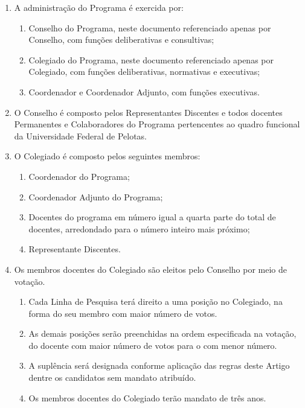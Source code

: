 \documentclass{article}
\newcommand{\grupoMenor}{Colegiado\xspace}
\newcommand{\grupoMaior}{Conselho\xspace}
\begin{document}
\begin{enumerate}

	\item A administração do Programa é exercida por:
	\begin{enumerate}[label=\Roman*]	
		\item \grupoMaior do Programa, neste documento referenciado apenas por \grupoMaior, com funções deliberativas e consultivas;
		\item \grupoMenor do Programa, neste documento referenciado apenas por \grupoMenor, com funções deliberativas, normativas e executivas;
		\item Coordenador e Coordenador Adjunto, com funções executivas.
	\end{enumerate}

	\item O \grupoMaior é composto pelos Representantes Discentes e todos docentes Permanentes e Colaboradores do Programa pertencentes ao quadro funcional da Universidade Federal de Pelotas.

	\item O \grupoMenor é composto pelos seguintes membros:
	\begin{enumerate}[label=\Roman*]
		\item Coordenador do Programa;
		\item Coordenador Adjunto do Programa;
		\item Docentes do programa em número igual a quarta parte do total de docentes, arredondado para o número inteiro mais próximo;
		\item Representante Discentes.
	\end{enumerate}

	\item Os membros docentes do \grupoMenor são eleitos pelo \grupoMaior por meio de votação.
	\begin{enumerate}
		\item Cada Linha de Pesquisa terá direito a uma posição no \grupoMenor, na forma do seu membro com maior número de votos.
		\item As demais posições serão preenchidas na ordem especificada na votação, do docente com maior número de votos para o com menor número.
		\item A suplência será designada conforme aplicação das regras deste Artigo dentre os candidatos sem mandato atribuído.
		\item Os membros docentes do \grupoMenor terão mandato de três anos.		
	\end{enumerate}


\end{enumerate}
\end{document}

